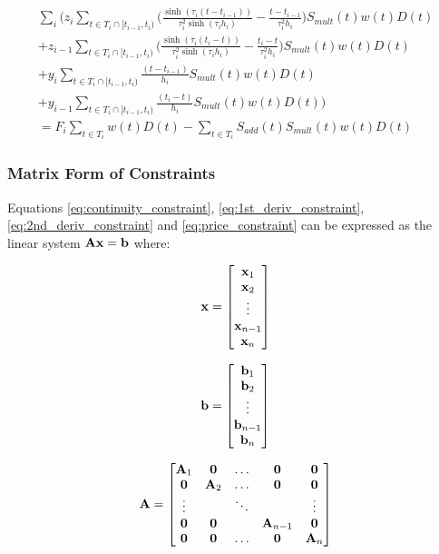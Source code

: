 \documentclass{article}
\begin{document}
\begin{multline}
    \sum_i \biggl(  z_i \sum_{t \in T_i \cap [t_{i-1}, t_i)} \biggl( \frac{\sinh(\tau_i (t - t_{i-1}))}{\tau_i^2 \sinh(\tau_i h_i)} 
      - \frac{t - t_{i-1}}{\tau_i^2 h_i} \biggr) S_{mult}(t)w(t)D(t) \\
    + z_{i-1} \sum_{t \in T_i \cap [t_{i-1}, t_i)} \biggl( \frac{\sinh(\tau_i (t_i - t))}{\tau_i^2 \sinh(\tau_i h_i)} 
     - \frac{t_i - t}{\tau_i^2 h_i} \biggr) S_{mult}(t)w(t)D(t) \\
    + y_i \sum_{t \in T_i \cap [t_{i-1}, t_i)} \frac{(t - t_{i-1})}{h_i} S_{mult}(t)w(t)D(t) \\
    + y_{i-1} \sum_{t \in T_i \cap [t_{i-1}, t_i)} \frac{(t_i - t)}{h_i} S_{mult}(t)w(t)D(t) \biggr) \\
    = F_i \sum_{t \in T_i} w(t)D(t) - \sum_{t \in T_i} S_{add}(t) S_{mult}(t)w(t)D(t)
\end{multline}


\subsubsection{Matrix Form of Constraints}
Equations \ref{eq:continuity_constraint}, \ref{eq:1st_deriv_constraint}, \ref{eq:2nd_deriv_constraint} and
 \ref{eq:price_constraint} can be expressed as the linear system $\mathbf{Ax = b}$ where:

\begin{equation*}
    \mathbf{x} = \begin{bmatrix}
        \mathbf{x}_1 \\
        \mathbf{x}_2 \\
        \vdots \\
        \mathbf{x}_{n-1} \\
        \mathbf{x}_n \\
    \end{bmatrix}
\end{equation*}

\begin{equation*}
    \mathbf{b} = \begin{bmatrix}
        \mathbf{b}_1 \\
        \mathbf{b}_2 \\
        \vdots \\
        \mathbf{b}_{n-1} \\
        \mathbf{b}_n \\
    \end{bmatrix}
\end{equation*}

\begin{equation*}
    \mathbf{A} = \begin{bmatrix}
        \mathbf{A}_1 & \mathbf{0} & \hdots & \mathbf{0} & \mathbf{0} \\
        \mathbf{0} & \mathbf{A}_2 & \hdots & \mathbf{0} & \mathbf{0} \\
        \vdots & & \ddots & & \vdots \\
        \mathbf{0} & \mathbf{0} & & \mathbf{A}_{n-1} & \mathbf{0} \\
        \mathbf{0} & \mathbf{0} & \hdots & \mathbf{0} & \mathbf{A}_n
    \end{bmatrix}
\end{equation*}
\end{document}
